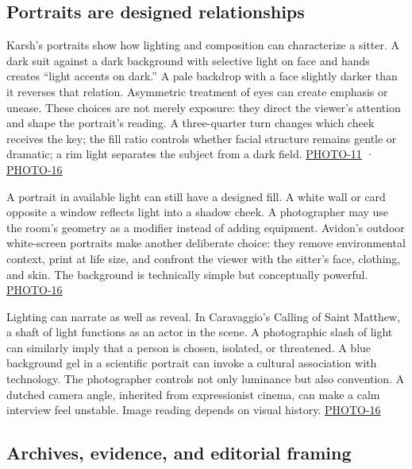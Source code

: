 \subsection{Portraits are designed relationships}\label{04-visual-computing-ii-ch034-portraits-are-designed-relationships}

Karsh's portraits show how lighting and composition can characterize a sitter. A dark suit against a dark background with selective light on face and hands creates ``light accents on dark.'' A pale backdrop with a face slightly darker than it reverses that relation. Asymmetric treatment of eyes can create emphasis or unease. These choices are not merely exposure: they direct the viewer's attention and shape the portrait's reading. A three-quarter turn changes which cheek receives the key; the fill ratio controls whether facial structure remains gentle or dramatic; a rim light separates the subject from a dark field. \hyperref[04-visual-computing-ii-ch036-photo-11---photography-session-11]{PHOTO-11} · \hyperref[04-visual-computing-ii-ch036-photo-16---photography-session-16]{PHOTO-16}

A portrait in available light can still have a designed fill. A white wall or card opposite a window reflects light into a shadow cheek. A photographer may use the room's geometry as a modifier instead of adding equipment. Avidon's outdoor white-screen portraits make another deliberate choice: they remove environmental context, print at life size, and confront the viewer with the sitter's face, clothing, and skin. The background is technically simple but conceptually powerful. \hyperref[04-visual-computing-ii-ch036-photo-16---photography-session-16]{PHOTO-16}

Lighting can narrate as well as reveal. In Caravaggio's Calling of Saint Matthew, a shaft of light functions as an actor in the scene. A photographic slash of light can similarly imply that a person is chosen, isolated, or threatened. A blue background gel in a scientific portrait can invoke a cultural association with technology. The photographer controls not only luminance but also convention. A dutched camera angle, inherited from expressionist cinema, can make a calm interview feel unstable. Image reading depends on visual history. \hyperref[04-visual-computing-ii-ch036-photo-16---photography-session-16]{PHOTO-16}

\subsection{Archives, evidence, and editorial framing}\label{04-visual-computing-ii-ch034-archives-evidence-and-editorial-framing}

